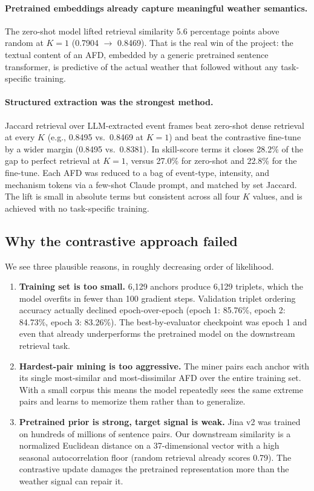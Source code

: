 \documentclass[11pt]{article}
\begin{document}
\paragraph{Pretrained embeddings already capture meaningful weather semantics.}
The zero-shot model lifted retrieval similarity 5.6 percentage points above random at \(K{=}1\) (0.7904 \(\rightarrow\) 0.8469). That is the real win of the project: the textual content of an AFD, embedded by a generic pretrained sentence transformer, is predictive of the actual weather that followed without any task-specific training.

\paragraph{Structured extraction was the strongest method.}
Jaccard retrieval over LLM-extracted event frames beat zero-shot dense retrieval at every \(K\) (e.g., 0.8495 vs.\ 0.8469 at \(K{=}1\)) and beat the contrastive fine-tune by a wider margin (0.8495 vs.\ 0.8381). In skill-score terms it closes 28.2\% of the gap to perfect retrieval at \(K{=}1\), versus 27.0\% for zero-shot and 22.8\% for the fine-tune. Each AFD was reduced to a bag of event-type, intensity, and mechanism tokens via a few-shot Claude prompt, and matched by set Jaccard. The lift is small in absolute terms but consistent across all four \(K\) values, and is achieved with no task-specific training.


\subsection{Why the contrastive approach failed}
We see three plausible reasons, in roughly decreasing order of likelihood.
\begin{enumerate}
  \item \textbf{Training set is too small.} 6{,}129 anchors produce 6{,}129 triplets, which the model overfits in fewer than 100 gradient steps. Validation triplet ordering accuracy actually declined epoch-over-epoch (epoch 1: 85.76\%, epoch 2: 84.73\%, epoch 3: 83.26\%). The best-by-evaluator checkpoint was epoch 1 and even that already underperforms the pretrained model on the downstream retrieval task.
  \item \textbf{Hardest-pair mining is too aggressive.} The miner pairs each anchor with its single most-similar and most-dissimilar AFD over the entire training set. With a small corpus this means the model repeatedly sees the same extreme pairs and learns to memorize them rather than to generalize.
  \item \textbf{Pretrained prior is strong, target signal is weak.} Jina v2 was trained on hundreds of millions of sentence pairs. Our downstream similarity is a normalized Euclidean distance on a 37-dimensional vector with a high seasonal autocorrelation floor (random retrieval already scores 0.79). The contrastive update damages the pretrained representation more than the weather signal can repair it.
\end{enumerate}
\end{document}
